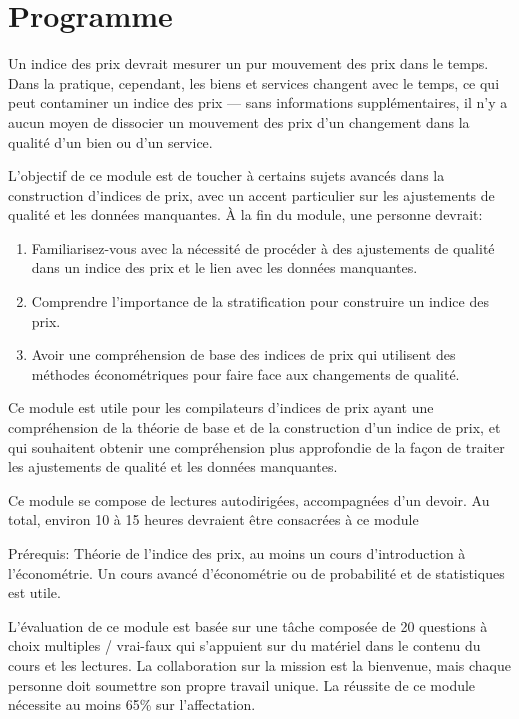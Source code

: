 \documentclass[]{article}
\begin{document}
\hypertarget{programme-2}{%
\section{Programme}\label{programme-2}}

Un indice des prix devrait mesurer un pur mouvement des prix dans le temps. Dans la pratique, cependant, les biens et services changent avec le temps, ce qui peut contaminer un indice des prix --- sans informations supplémentaires, il n'y a aucun moyen de dissocier un mouvement des prix d'un changement dans la qualité d'un bien ou d'un service.

L'objectif de ce module est de toucher à certains sujets avancés dans la construction d'indices de prix, avec un accent particulier sur les ajustements de qualité et les données manquantes. À la fin du module, une personne devrait:

\begin{enumerate}
\def\labelenumi{\arabic{enumi}.}
\item
  Familiarisez-vous avec la nécessité de procéder à des ajustements de qualité dans un indice des prix et le lien avec les données manquantes.
\item
  Comprendre l'importance de la stratification pour construire un indice des prix.
\item
  Avoir une compréhension de base des indices de prix qui utilisent des méthodes économétriques pour faire face aux changements de qualité.
\end{enumerate}

Ce module est utile pour les compilateurs d'indices de prix ayant une compréhension de la théorie de base et de la construction d'un indice de prix, et qui souhaitent obtenir une compréhension plus approfondie de la façon de traiter les ajustements de qualité et les données manquantes.

Ce module se compose de lectures autodirigées, accompagnées d'un devoir. Au total, environ 10 à 15 heures devraient être consacrées à ce module

Prérequis: Théorie de l'indice des prix, au moins un cours d'introduction à l'économétrie. Un cours avancé d'économétrie ou de probabilité et de statistiques est utile.

L'évaluation de ce module est basée sur une tâche composée de 20 questions à choix multiples / vrai-faux qui s'appuient sur du matériel dans le contenu du cours et les lectures. La collaboration sur la mission est la bienvenue, mais chaque personne doit soumettre son propre travail unique. La réussite de ce module nécessite au moins 65\% sur l'affectation.
\end{document}
